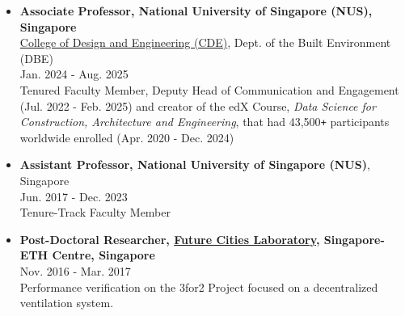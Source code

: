 \documentclass[10pt,a4paper]{article}
\begin{document}
\begin{small}
\begin{itemize}
\item 
{\bf Associate Professor, National University of Singapore (NUS), Singapore}\\
\href{https://cde.nus.edu.sg}{College of Design and Engineering (CDE)}, Dept. of the Built Environment (DBE)\\
Jan. 2024 - Aug. 2025\\
Tenured Faculty Member, Deputy Head of Communication and Engagement (Jul. 2022 - Feb. 2025) and creator of the edX Course, \emph{Data Science for Construction, Architecture and Engineering}, that had 43,500\texttt{+} participants worldwide enrolled (Apr. 2020 - Dec. 2024)

\item 
{\bf Assistant Professor, National University of Singapore (NUS)}, Singapore\\
Jun. 2017 - Dec. 2023\\
Tenure-Track Faculty Member

\item 
{\bf Post-Doctoral Researcher, \href{https://fcl.ethz.ch}{Future Cities Laboratory}, Singapore-ETH Centre, Singapore}\\
Nov. 2016 - Mar. 2017\\
Performance verification on the 3for2 Project focused on a decentralized ventilation system.


\end{itemize}
\end{small}
\end{document}
